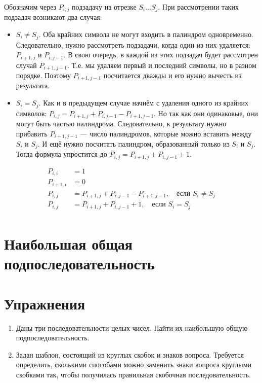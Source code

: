 \documentclass[14pt,openany]{book}
\begin{document}
Обозначим через $P_{i,j}$ подзадачу на отрезке $S_i \ldots S_j$.
При рассмотрении таких подзадач возникают два случая:
\begin{itemize}
\item $S_i \neq S_j$. Оба крайних символа не могут входить в палиндром одновременно.
      Следовательно, нужно рассмотреть подзадачи, когда один из них удаляется: $P_{i+1,j}$ и $P_{i,j-1}$.
      В свою очередь, в каждой из этих подзадач будет рассмотрен случай $P_{i+1,j-1}$.
      Т.е. мы удаляем первый и последний символы, но в разном порядке.
      Поэтому $P_{i+1,j-1}$ посчитается дважды и его нужно вычесть из результата.
\item $S_i = S_j$. Как и в предыдущем случае начнём с удаления одного из крайних символов:
      $P_{i,j} = P_{i+1,j} + P_{i,j-1} - P_{i+1,j-1}$. Но так как они одинаковые, они
      могут быть частью палиндрома. Следовательно, к результату нужно прибавить
      $P_{i+1,j-1}$ --- число палиндромов, которые можно вставить между $S_i$ и $S_j$.
      И ещё нужно посчитать палиндром, образованный только из $S_i$ и $S_j$.
      Тогда формула упростится до $P_{i,j} = P_{i+1,j} + P_{i,j-1} + 1$.
\end{itemize}

\begin{align*}
P_{i,i} &= 1 \\
P_{i+1,i} &= 0 \\
P_{i,j} &= P_{i+1,j} + P_{i,j-1} - P_{i+1,j-1}, \quad \text{если $S_i \neq S_j$} \\
P_{i,j} &= P_{i+1,j} + P_{i,j-1} + 1, \quad \text{если $S_i=S_j$} \\
\end{align*}


\section{Наибольшая общая подпоследовательность}

\section{Упражнения}

\begin{enumerate}

\item Даны три последовательности целых чисел. Найти их наибольшую общую подпоследовательность.

\item Задан шаблон, состоящий из круглых скобок и знаков вопроса. Требуется определить, сколькими
      способами можно заменить знаки вопроса круглыми скобками так, чтобы получилась правильная
      скобочная последовательность.

\end{enumerate}
\end{document}
